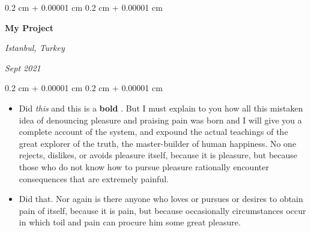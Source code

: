 \documentclass[10pt, letterpaper]{article}
\newenvironment{highlights}{
    \begin{itemize}[
        topsep=0.10 cm,
        parsep=0.10 cm,
        partopsep=0pt,
        itemsep=0pt,
        leftmargin=0.4 cm + 10pt
    ]
}{
    \end{itemize}
} %
\newenvironment{onecolentry}{
    \begin{adjustwidth}{
        0.2 cm + 0.00001 cm
    }{
        0.2 cm + 0.00001 cm
    }
}{
    \end{adjustwidth}
} %
\newenvironment{twocolentry}[2][]{
    \onecolentry
    \def\secondColumn{#2}
    \setcolumnwidth{\fill, 4.5 cm}
    \begin{paracol}{2}
}{
    \switchcolumn \raggedleft \secondColumn
    \end{paracol}
    \endonecolentry
} %
\let\hrefWithoutArrow\href
\renewcommand{\href}[2]{\hrefWithoutArrow{#1}{\ifthenelse{\equal{#2}{}}{ }{#2 }\raisebox{.15ex}{\footnotesize \faExternalLink*}}}
\begin{document}
        \begin{twocolentry}{
        \textit{Istanbul, Turkey}    
            
        \textit{Sept 2021}}
            \textbf{My Project}
        \end{twocolentry}
        \vspace{0.10 cm}
        \begin{onecolentry}
            \begin{highlights}
                \item Did \textit{this} and this is a \textbf{bold} \href{https://example.com}{link}. But I must explain to you how all this mistaken idea of denouncing pleasure and praising pain was born and I will give you a complete account of the system, and expound the actual teachings of the great explorer of the truth, the master-builder of human happiness. No one rejects, dislikes, or avoids pleasure itself, because it is pleasure, but because those who do not know how to pursue pleasure rationally encounter consequences that are extremely painful.
                \item Did that. Nor again is there anyone who loves or pursues or desires to obtain pain of itself, because it is pain, but because occasionally circumstances occur in which toil and pain can procure him some great pleasure.
            \end{highlights}
        \end{onecolentry}


        \vspace{0.2 cm}
\end{document}
